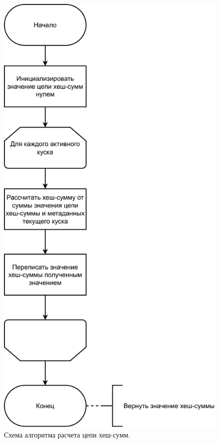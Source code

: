 \begin{figure}[hbtp]
	\centering
	\includegraphics[scale=0.8]{img/recalcalgo.pdf}
	\caption{Схема алгоритма расчета цепи хеш-сумм.}
	\label{fig:recalcalgo}
\end{figure}

